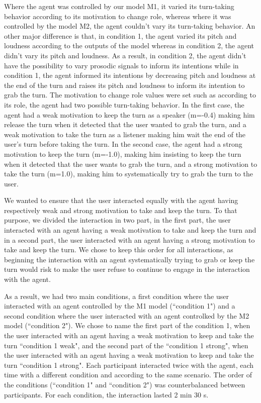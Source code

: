 Where the agent was controlled by our model M1, it varied its turn-taking behavior according to its motivation to change role, whereas where it was controlled by the model M2, the agent couldn't vary its turn-taking behavior. An other major difference is that, in condition 1, the agent varied its pitch and loudness according to the outputs of the model whereas in condition 2, the agent didn't vary its pitch and loudness. As a result, in condition 2, the agent didn't have the possibility to vary prosodic signals to inform its intentions while in condition 1, the agent informed its intentions by decreasing pitch and loudness at the end of the turn and raises its pitch and loudness to inform its intention to grab the turn. 
The motivation to change role values were set such as according to its role, the agent had two possible turn-taking behavior. In the first case, the agent had a weak motivation to keep the turn as a speaker (m=-0.4) making him release the turn when it detected that the user wanted to grab the turn, and a weak motivation to take the turn as a listener making him wait the end of the user's turn before taking the turn. In the second case, the agent had a strong motivation to keep the turn (m=-1.0), making him insisting to keep the turn when it detected that the user wants to grab the turn, and a strong motivation to take the turn (m=1.0), making him to systematically try to grab the turn to the user. 

We wanted to ensure that the user interacted equally with the agent having respectively weak and strong motivation to take and keep the turn. To that purpose, we divided the interaction in two part, in the first part, the user interacted with an agent having a weak motivation to take and keep the turn and in a second part, the user interacted with an agent having a strong motivation to take and keep the turn. We chose to keep this order for all interactions, as beginning the interaction with an agent systematically trying to grab or keep the turn would risk to make the user refuse to continue to engage in the interaction with the agent. 

As a result, we had two main conditions, a first condition where the user interacted with an agent controlled by the M1 model (``condition 1") and a second condition where the user interacted with an agent controlked by the M2 model (``condition 2"). We chose to name the first part of the condition 1, when the user interacted with an agent having a weak motivation to keep and take the turn ``condition 1 weak", and the second part of the ``condition 1 strong", when the user interacted with an agent having a weak motivation to keep and take the turn ``condition 1 strong". 
Each participant interacted twice with the agent, each time with a different condition and according to the same scenario.
The order of the conditions (``condition 1" and ``condition 2") was counterbalanced between participants.
 For each condition, the interaction lasted 2 min 30 s. 

